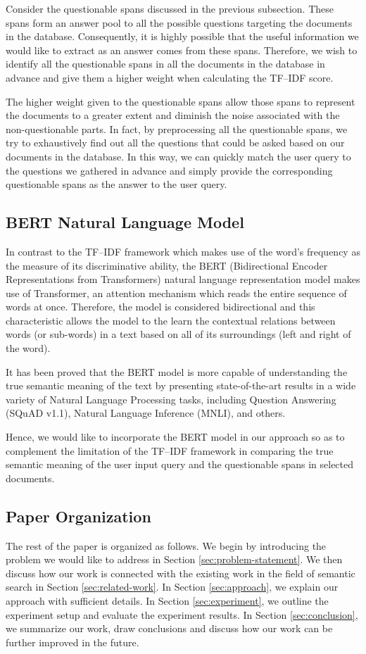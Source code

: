 Consider the questionable spans discussed in the previous subsection. These spans form an answer pool to all the possible questions targeting the documents in the database. Consequently, it is highly possible that the useful information we would like to extract as an answer comes from these spans. Therefore, we wish to identify all the questionable spans in all the documents in the database in advance and give them a higher weight when calculating the TF--IDF score.

The higher weight given to the questionable spans allow those spans to represent the documents to a greater extent and diminish the noise associated with the non-questionable parts. In fact, by preprocessing all the questionable spans, we try to exhaustively find out all the questions that could be asked based on our documents in the database. In this way, we can quickly match the user query to the questions we gathered in advance and simply provide the corresponding questionable spans as the answer to the user query.


\subsection{BERT Natural Language Model}
In contrast to the TF--IDF framework which makes use of the word's frequency as the measure of its discriminative ability, the BERT (Bidirectional Encoder Representations from Transformers) natural language representation model \cite{devlin2018bert} makes use of Transformer, an attention mechanism which reads the entire sequence of words at once. Therefore, the model is considered bidirectional and this characteristic allows the model to the learn the contextual relations between words (or sub-words) in a text based on all of its surroundings (left and right of the word).

It has been proved that the BERT model is more capable of understanding the true semantic meaning of the text by presenting state-of-the-art results in a wide variety of Natural Language Processing tasks, including Question Answering (SQuAD v1.1), Natural Language Inference (MNLI), and others.

Hence, we would like to incorporate the BERT model in our approach so as to complement the limitation of the TF--IDF framework in comparing the true semantic meaning of the user input query and the questionable spans in selected documents.

\subsection{Paper Organization}
The rest of the paper is organized as follows. We begin by introducing the problem we would like to address in Section \ref{sec:problem-statement}. We then discuss how our work is connected with the existing work in the field of semantic search in Section \ref{sec:related-work}. In Section \ref{sec:approach}, we explain our approach with sufficient details. In Section \ref{sec:experiment}, we outline the experiment setup and evaluate the experiment results. In Section \ref{sec:conclusion}, we summarize our work, draw conclusions and discuss how our work can be further improved in the future.

